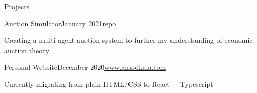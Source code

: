 \documentclass{resume} %
\begin{document}
	\begin{rSection}{Projects}
	
	    \begin{rSubsection}{Auction Simulator}{January 2021}{\href{https://www.github.com/amodkala/auction}{repo}}{}
		\item Creating a multi-agent auction system to further my understanding of economic auction theory
		\end{rSubsection}
	
	   \begin{rSubsection}{Personal Website}{December 2020}{\href{https://www.amodkala.com}{www.amodkala.com}}{}
	   \item Currently migrating from plain HTML/CSS to React + Typescript
		\end{rSubsection}   
		
	\end{rSection}
\end{document}
